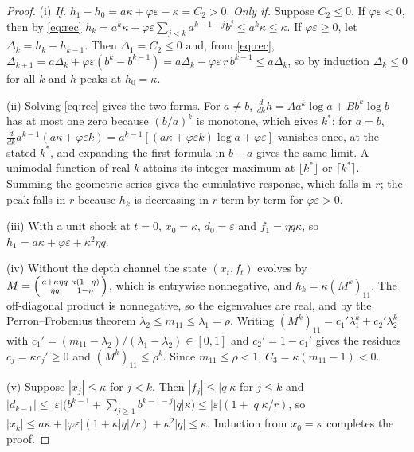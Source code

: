 \documentclass[12pt]{article}
\theoremstyle{definition}
\theoremstyle{remark}
\begin{document}
\begin{proof}
(i) \emph{If.} $h_1-h_0=a\kappa+\varphi\varepsilon-\kappa=C_2>0$. \emph{Only if.} Suppose $C_2\le0$. If $\varphi\varepsilon<0$, then by \eqref{eq:rec} $h_k=a^k\kappa+\varphi\varepsilon\sum_{j<k}a^{k-1-j}b^j\le a^k\kappa\le\kappa$. If $\varphi\varepsilon\ge0$, let $\Delta_k=h_k-h_{k-1}$. Then $\Delta_1=C_2\le0$ and, from \eqref{eq:rec}, $\Delta_{k+1}=a\Delta_k+\varphi\varepsilon(b^{k}-b^{k-1})=a\Delta_k-\varphi\varepsilon\,r\,b^{k-1}\le a\Delta_k$, so by induction $\Delta_k\le0$ for all $k$ and $h$ peaks at $h_0=\kappa$.

(ii) Solving \eqref{eq:rec} gives the two forms. For $a\ne b$, $\frac{d}{dk}h=Aa^k\log a+Bb^k\log b$ has at most one zero because $(b/a)^k$ is monotone, which gives $k^*$; for $a=b$, $\frac{d}{dk}a^{k-1}(a\kappa+\varphi\varepsilon k)=a^{k-1}[(a\kappa+\varphi\varepsilon k)\log a+\varphi\varepsilon]$ vanishes once, at the stated $k^*$, and expanding the first formula in $b-a$ gives the same limit. A unimodal function of real $k$ attains its integer maximum at $\lfloor k^*\rfloor$ or $\lceil k^*\rceil$. Summing the geometric series gives the cumulative response, which falls in $r$; the peak falls in $r$ because $h_k$ is decreasing in $r$ term by term for $\varphi\varepsilon>0$.

(iii) With a unit shock at $t=0$, $x_0=\kappa$, $d_0=\varepsilon$ and $f_1=\eta q\kappa$, so $h_1=a\kappa+\varphi\varepsilon+\kappa^2\eta q$.

(iv) Without the depth channel the state $(x_t,f_t)$ evolves by $M=\begin{psmallmatrix}a+\kappa\eta q&\kappa(1-\eta)\\ \eta q&1-\eta\end{psmallmatrix}$, which is entrywise nonnegative, and $h_k=\kappa(M^k)_{11}$. The off-diagonal product is nonnegative, so the eigenvalues are real, and by the Perron--Frobenius theorem $\lambda_2\le m_{11}\le\lambda_1=\rho$. Writing $(M^k)_{11}=c_1'\lambda_1^k+c_2'\lambda_2^k$ with $c_1'=(m_{11}-\lambda_2)/(\lambda_1-\lambda_2)\in[0,1]$ and $c_2'=1-c_1'$ gives the residues $c_j=\kappa c_j'\ge0$ and $(M^k)_{11}\le\rho^k$. Since $m_{11}\le\rho<1$, $C_3=\kappa(m_{11}-1)<0$.

(v) Suppose $|x_j|\le\kappa$ for $j<k$. Then $|f_j|\le|q|\kappa$ for $j\le k$ and $|d_{k-1}|\le|\varepsilon|\bigl(b^{k-1}+\sum_{j\ge1}b^{k-1-j}|q|\kappa\bigr)\le|\varepsilon|(1+|q|\kappa/r)$, so $|x_k|\le a\kappa+|\varphi\varepsilon|(1+\kappa|q|/r)+\kappa^2|q|\le\kappa$. Induction from $x_0=\kappa$ completes the proof.
\end{proof}
\end{document}

